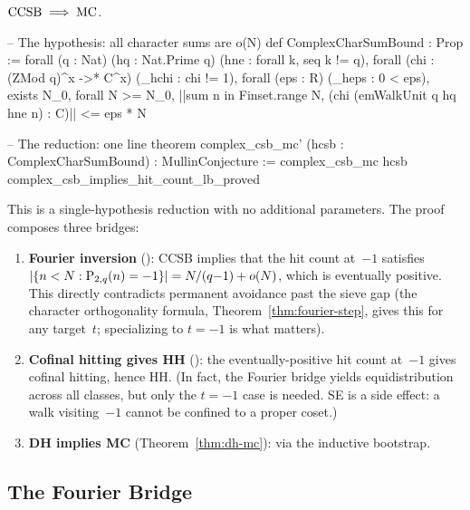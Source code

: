 \begin{keyresult}
\begin{theorem}
\label{thm:ccsb-mc}
$\mathrm{CCSB} \;\Longrightarrow\; \mathrm{MC}$.
\end{theorem}
\end{keyresult}

\begin{leancode}
-- The hypothesis: all character sums are o(N)
def ComplexCharSumBound : Prop :=
  forall (q : Nat) (hq : Nat.Prime q) (hne : forall k, seq k != q),
  forall (chi : (ZMod q)^x ->* C^x) (_hchi : chi != 1),
  forall (eps : R) (_heps : 0 < eps),
  exists N_0, forall N >= N_0,
    ||sum n in Finset.range N, (chi (emWalkUnit q hq hne n) : C)|| <= eps * N

-- The reduction: one line
theorem complex_csb_mc' (hcsb : ComplexCharSumBound) : MullinConjecture :=
  complex_csb_mc hcsb complex_csb_implies_hit_count_lb_proved
\end{leancode}

This is a single-hypothesis reduction with no additional parameters.
The proof composes three bridges:

\begin{enumerate}[nosep]
\item \textbf{Fourier inversion} ():
  CCSB implies that the hit count at~$-1$ satisfies
  $|\{n < N : \mathrm{P}_{2,q}(n) = -1\}| = N/(q{-}1) + o(N)$,
  which is eventually positive.  This directly contradicts permanent
  avoidance past the sieve gap (the character orthogonality formula,
  Theorem~\ref{thm:fourier-step}, gives this for any target~$t$;
  specializing to $t = -1$ is what matters).

\item \textbf{Cofinal hitting gives HH}
  ():
  the eventually-positive hit count at~$-1$ gives cofinal hitting,
  hence HH\@.  (In fact, the Fourier bridge yields equidistribution
  across all classes, but only the $t = -1$ case is needed.  SE is a
  side effect: a walk visiting~$-1$ cannot be confined to a proper
  coset.)

\item \textbf{DH implies MC} (Theorem~\ref{thm:dh-mc}): via the
  inductive bootstrap.
\end{enumerate}

\subsection{The Fourier Bridge}

